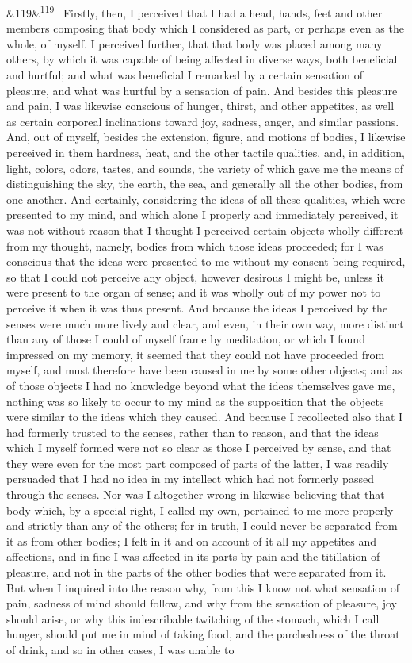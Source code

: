 \documentclass[12pt]{article}
\newcommand{\para}[1][]{\par\noindent\ifx&#1&\else\textsuperscript{\footnotesize #1}~\fi}
\begin{document}
\para[119] Firstly, then, I perceived that I had a head, hands, feet and other members composing that body which I considered as part, or perhaps even as the whole, of myself. I perceived further, that that body was placed among many others, by which it was capable of being affected in diverse ways, both beneficial and hurtful; and what was beneficial I remarked by a certain sensation of pleasure, and what was hurtful by a sensation of pain. And besides this pleasure and pain, I was likewise conscious of hunger, thirst, and other appetites, as well as certain corporeal inclinations toward joy, sadness, anger, and similar passions. And, out of myself, besides the extension, figure, and motions of bodies, I likewise perceived in them hardness, heat, and the other tactile qualities, and, in addition, light, colors, odors, tastes, and sounds, the variety of which gave me the means of distinguishing the sky, the earth, the sea, and generally all the other bodies, from one another. And certainly, considering the ideas of all these qualities, which were presented to my mind, and which alone I properly and immediately perceived, it was not without reason that I thought I perceived certain objects wholly different from my thought, namely, bodies from which those ideas proceeded; for I was conscious that the ideas were presented to me without my consent being required, so that I could not perceive any object, however desirous I might be, unless it were present to the organ of sense; and it was wholly out of my power not to perceive it when it was thus present. And because the ideas I perceived by the senses were much more lively and clear, and even, in their own way, more distinct than any of those I could of myself frame by meditation, or which I found impressed on my memory, it seemed that they could not have proceeded from myself, and must therefore have been caused in me by some other objects; and as of those objects I had no knowledge beyond what the ideas themselves gave me, nothing was so likely to occur to my mind as the supposition that the objects were similar to the ideas which they caused. And because I recollected also that I had formerly trusted to the senses, rather than to reason, and that the ideas which I myself formed were not so clear as those I perceived by sense, and that they were even for the most part composed of parts of the latter, I was readily persuaded that I had no idea in my intellect which had not formerly passed through the senses. Nor was I altogether wrong in likewise believing that that body which, by a special right, I called my own, pertained to me more properly and strictly than any of the others; for in truth, I could never be separated from it as from other bodies; I felt in it and on account of it all my appetites and affections, and in fine I was affected in its parts by pain and the titillation of pleasure, and not in the parts of the other bodies that were separated from it. But when I inquired into the reason why, from this I know not what sensation of pain, sadness of mind should follow, and why from the sensation of pleasure, joy should arise, or why this indescribable twitching of the stomach, which I call hunger, should put me in mind of taking food, and the parchedness of the throat of drink, and so in other cases, I was unable to 
\end{document}
